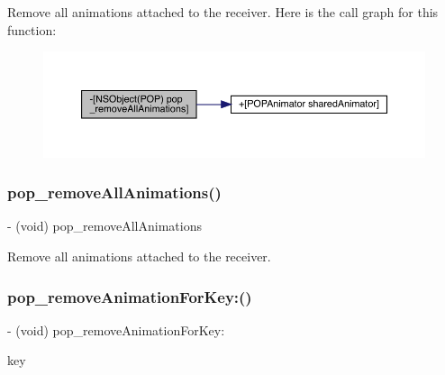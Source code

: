 Remove all animations attached to the receiver. Here is the call graph for this function\+:\nopagebreak
\begin{figure}[H]
\begin{center}
\leavevmode
\includegraphics[width=350pt]{category_n_s_object_07_p_o_p_08_a8b24200d2a40751755a930f833582296_cgraph}
\end{center}
\end{figure}
\mbox{\label{category_n_s_object_07_p_o_p_08_a8b24200d2a40751755a930f833582296}} 
\subsubsection{\texorpdfstring{pop\+\_\+remove\+All\+Animations()}{pop\_removeAllAnimations()}\hspace{0.1cm}{\footnotesize\ttfamily [3/3]}}
{\footnotesize\ttfamily -\/ (void) pop\+\_\+remove\+All\+Animations \begin{DoxyParamCaption}{ }\end{DoxyParamCaption}}

Remove all animations attached to the receiver. \mbox{\label{category_n_s_object_07_p_o_p_08_a8ac27f1251e5b55eb426e829265d23b6}} 
\subsubsection{\texorpdfstring{pop\+\_\+remove\+Animation\+For\+Key\+:()}{pop\_removeAnimationForKey:()}\hspace{0.1cm}{\footnotesize\ttfamily [1/3]}}
{\footnotesize\ttfamily -\/ (void) pop\+\_\+remove\+Animation\+For\+Key\+: \begin{DoxyParamCaption}\item[{(N\+S\+String $\ast$)}]{key }\end{DoxyParamCaption}}

